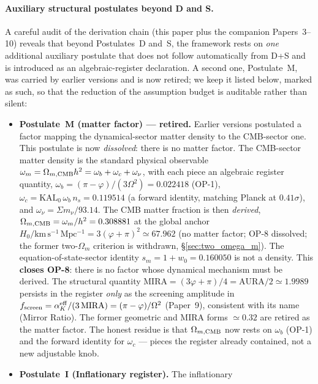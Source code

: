 \documentclass[12pt,a4paper]{article}
\newcommand{\kmsu}{\mathrm{km\,s^{-1}\,Mpc^{-1}}}
\begin{document}
\paragraph{Auxiliary structural postulates beyond D and S.}
A careful audit of the derivation chain (this paper plus the companion
Papers~3--10) reveals that beyond Postulates~D and~S, the framework rests on
\emph{one} additional auxiliary postulate that does not follow automatically
from D+S and is introduced as an algebraic-register declaration. A second one,
Postulate~M, was carried by earlier versions and is now retired; we keep it
listed below, marked as such, so that the reduction of the assumption budget
is auditable rather than silent:
\begin{itemize}\itemsep1pt
  \item \textbf{Postulate~M (matter factor) --- retired.} Earlier versions
        postulated a factor mapping the dynamical-sector matter density to the
        CMB-sector one. This postulate is now \emph{dissolved}: there is no
        matter factor. The CMB-sector matter density is the standard physical
        observable $\omega_m=\Omega_{m,\rm CMB}h^2=\omega_b+\omega_c+\omega_\nu$,
        with each piece an algebraic register quantity,
        $\omega_b=(\pi-\varphi)/(3\Omega^2)=0.022418$ (OP-1),
        $\omega_c=\mathrm{KAL}_0\,\omega_b\,n_s=0.119514$ (a forward identity,
        matching Planck at $0.41\sigma$), and $\omega_\nu=\Sigma m_\nu/93.14$.
        The CMB matter fraction is then \emph{derived},
        $\Omega_{m,\rm CMB}=\omega_m/h^2=0.308881$ at the global anchor
        $H_0/\kmsu=3(\varphi+\pi)^2\simeq67.962$ (no matter factor; OP-8
        dissolved; the former two-$\Omega_m$ criterion is withdrawn,
        \S\ref{sec:two_omega_m}). The equation-of-state-sector identity
        $s_m=1+w_0=0.160050$ is not a density. This \textbf{closes OP-8}:
        there is no factor whose dynamical mechanism
        must be derived. The structural quantity
        $\mathrm{MIRA}=(3\varphi+\pi)/4=\mathrm{AURA}/2\simeq1.9989$ persists in
        the register \emph{only} as the screening amplitude in
        $f_{\rm screen}=\alpha_K^{\rm eff}/(3\,\mathrm{MIRA})=(\pi-\varphi)/\Omega^2$
        (Paper~9), consistent with its name (Mirror Ratio). The former
        geometric and MIRA forms $\simeq0.32$ are retired as the matter factor.
        The honest residue is that $\Omega_{m,\rm CMB}$ now rests on $\omega_b$
        (OP-1) and the forward identity for $\omega_c$ --- pieces the register
        already contained, not a new adjustable knob.
  \item \textbf{Postulate~I (Inflationary register).} The inflationary

\end{itemize}
\end{document}
